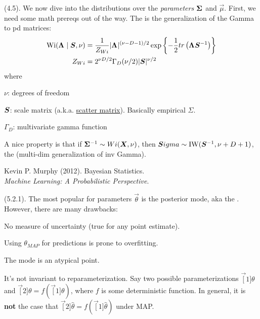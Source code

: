 \documentclass[11pt]{article}
\begin{document}
\myspace
\p {} (4.5). We now dive into the distributions over the \textit{parameters} $\bm{\Sigma}_{}$ and $\vec\mu$. First, we need some math prereqs out of the way. The  is the generalization of the Gamma to pd matrices:
\begin{align}
	\text{Wi}(\bm{\Lambda}_{} \mid \bm{S}_{}, \nu)
		&= \frac{1}{Z_{Wi}} | \bm{\Lambda}_{} |^{(\nu - D - 1) / 2} \exp\left\{ - \frac{1}{2} tr\left(  \bm{\Lambda}_{} \bm{S}_{}^{-1} \right) \right\} \\
	Z_{Wi} 
		&= 2^{\nu D / 2 } \Gamma_D(\nu / 2) | \bm{S}_{} |^{\nu/2}
\end{align}
where
\begin{compactitem}
	\item $\nu$: degrees of freedom
	
	\item $\bm{S}_{}$: scale matrix (a.k.a. \href{https://www.wikiwand.com/en/Scatter_matrix}{scatter matrix}). Basically empirical $\Sigma$. 
	
	\item $\Gamma_D$: multivariate gamma function
\end{compactitem}
A nice property is that if $\bm{\Sigma}_{}^{-1} \sim Wi(\bm{X}_{}, \nu)$, then $\bm{S}_{}igma \sim \text{IW}(\bm{S}_{}^{-1}, \nu + D + 1)$, the  (multi-dim generalization of inv Gamma). 







\vspace{-1.7em}
{\scriptsize Kevin P. Murphy (2012). Bayesian Statistics.\\ \textit{Machine Learning: A Probabilistic Perspective}.\\ }

\p {} (5.2.1). The most popular  for parameters $\vec\theta$ is the posterior mode, aka the . However, there are many drawbacks:
\begin{compactitem}
	\item No measure of uncertainty (true for any point estimate). 
	
	\item Using $\theta_{MAP}$ for predictions is prone to overfitting.
	
	\item The mode is an atypical point.
	
	\item It's not invariant to reparameterization. Say two possible parameterizations $\vec[1]{\theta}$ and $\vec[2]{\theta} {=} f(\vec[1]{\theta})$, where $f$ is some deterministic function. In general, it is \textbf{not} the case that $\vec[2]{\hat\theta} = f(\vec[1]{\hat{\theta}})$ under MAP. 
\end{compactitem}
\end{document}
